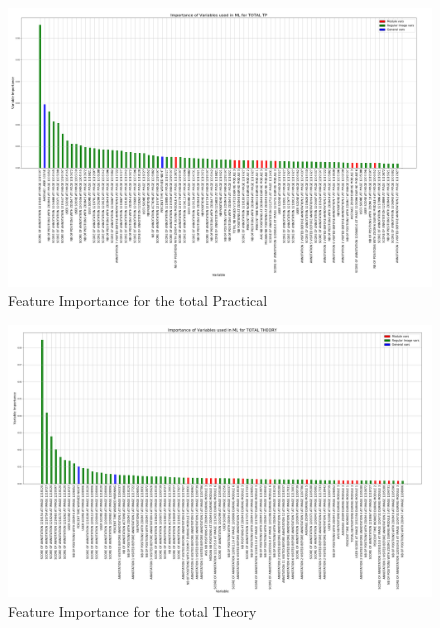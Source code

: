 \documentclass[a4paper,11pt]{report}
\numberwithin{figure}{chapter} %
\begin{document}
      \begin{figure}[H]
      \centering
      \includegraphics[width=.95\linewidth]{plots/var_importance_TOTAL_TP_2018-04-29_14_37_37.png}
      \caption{Feature Importance for the total Practical}
      \label{fig:var_tot1}
      \end{figure}

      \begin{figure}[H]
      \centering
      \includegraphics[width=.95\linewidth]{plots/var_importance_TOTAL_THEORY_2018-05-02_23_31_54.png}
      \caption{Feature Importance for the total Theory}
      \label{fig:var_tot2}
      \end{figure}
\end{document}
